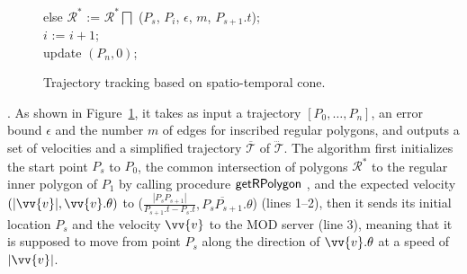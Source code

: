 \begin{figure}[tb!]
\begin{center}
{\begin{minipage}{3.3in}
{					\icc \>\hspace{3ex} else $\mathcal{R}^*$ := $\mathcal{R}^*\bigsqcap$ ($P_s$, $P_{i}$, $\epsilon$, $m$, $P_{s+1}.t$); \\
					\icc \>\hspace{3ex} $i$ := $i +1$;	\\
					\icc \>\hspace{0ex} update $(P_{n}, 0)$; 
				}
				\vspace{-2ex}
				\myhrule
			\end{minipage}
		}
	\end{center}
	\vspace{-2ex}
	\caption{\small Trajectory tracking based on spatio-temporal cone.}
	\label{alg:citt-s-full}
	\vspace{-3ex}
\end{figure}

.
As shown in Figure~\ref{alg:citt-s-full}, it takes as input a trajectory ${[P_0, \ldots, P_n]}$, an error bound $\epsilon$ and the number $m$ of edges for inscribed regular polygons, and outputs a set of velocities and a simplified  trajectory $\overline{\mathcal{T}}$ of $\dddot{\mathcal{T}}$.
%
The algorithm first initializes the start point $P_s$ to $P_0$, the common intersection of polygons $\mathcal{R}^*$ to the regular inner polygon of $P_1$ by calling procedure ${\mathsf{getRPolygon}}$ \cite{Lin:Cised}, and the expected velocity $(|\vv{v}|, \vv{v}.\theta)$ to ($\frac{|P_{s}P_{s+1}|}{P_{s+1}.t-P_s.t},\overline{P_{s}P_{s+1}}.\theta$) (lines 1--2), then it sends its initial location $P_s$ and the velocity $\vv{v}$ to the MOD server (line 3), meaning that it is supposed to move from point $P_s$ along the direction of $\vv{v}.\theta$ at a speed of $|\vv{v}|$.

